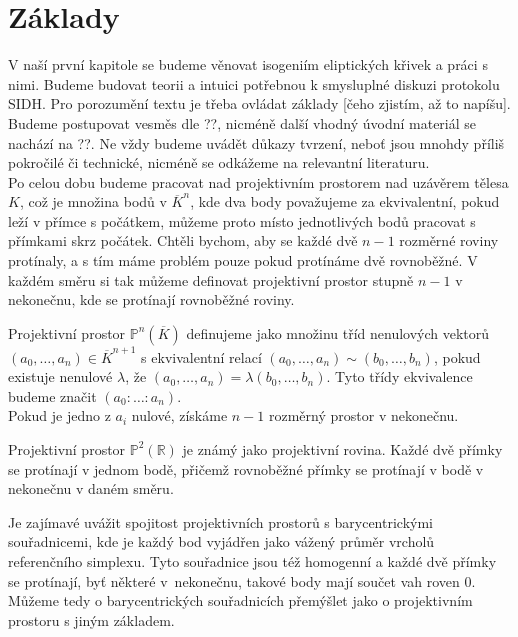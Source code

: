\documentclass [12pt]{report}
\begin{document}
\section{Základy}

V naší první kapitole se budeme věnovat isogeniím eliptických křivek a práci s nimi. Budeme budovat teorii a intuici potřebnou k smysluplné diskuzi protokolu SIDH. Pro porozumění textu je třeba ovládat základy [čeho zjistím, až to napíšu]. Budeme postupovat vesměs dle ??, nicméně další vhodný úvodní materiál se nachází na ??. Ne vždy budeme uvádět důkazy tvrzení, neboť jsou mnohdy příliš pokročilé či technické, nicméně se odkážeme na relevantní literaturu. \\

Po celou dobu budeme pracovat nad projektivním prostorem nad uzávěrem tělesa $K$, což je množina bodů v $\overline{K}^n$, kde dva body považujeme za ekvivalentní, pokud leží v přímce s počátkem, můžeme proto místo jednotlivých bodů pracovat s přímkami skrz počátek. Chtěli bychom, aby se každé dvě $n-1$ rozměrné roviny protínaly, a s tím máme problém pouze pokud protínáme dvě rovnoběžné. V každém směru si tak můžeme definovat projektivní prostor stupně $n-1$ v nekonečnu, kde se protínají rovnoběžné roviny.

\begin{definice}
Projektivní prostor $\mathbb{P}^n (\overline{K})$ definujeme jako množinu tříd nenulových vektorů $(a_0, \dots, a_n) \in \overline{K}^{n+1}$ s ekvivalentní relací $(a_0, \dots, a_n) \sim (b_0, \dots, b_n)$, pokud existuje nenulové $\lambda$, že $(a_0, \dots, a_n) = \lambda (b_0, \dots, b_n)$. Tyto třídy ekvivalence budeme značit $(a_0 : \dots : a_n)$.\\

Pokud je jedno z $a_i$ nulové, získáme $n-1$ rozměrný prostor v nekonečnu.
\end{definice}

Projektivní prostor $\mathbb{P}^2 (\mathbb{R})$ je známý jako projektivní rovina. Každé dvě přímky se protínají v jednom bodě, přičemž rovnoběžné přímky se protínají v bodě v nekonečnu v daném směru.

\begin{poznamka}
Je zajímavé uvážit spojitost projektivních prostorů s barycentrickými souřadnicemi, kde je každý bod vyjádřen jako vážený průměr vrcholů referenčního simplexu. Tyto souřadnice jsou též homogenní a každé dvě přímky se protínají, byť některé v~nekonečnu, takové body mají součet vah roven $0$. Můžeme tedy o barycentrických souřadnicích přemýšlet jako o projektivním prostoru s jiným základem.
\end{poznamka}
\end{document}
